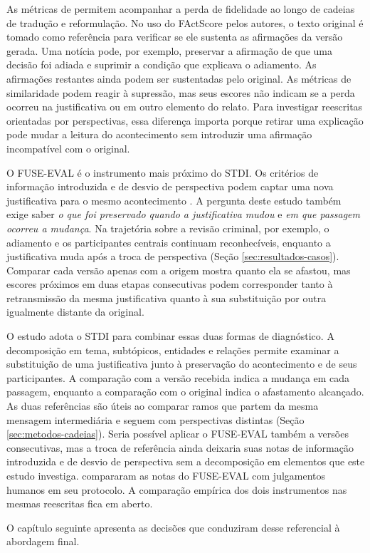 As métricas de  permitem acompanhar a perda de fidelidade ao longo de cadeias de tradução e reformulação. No uso do FActScore pelos autores, o texto original é tomado como referência para verificar se ele sustenta as afirmações da versão gerada. Uma notícia pode, por exemplo, preservar a afirmação de que uma decisão foi adiada e suprimir a condição que explicava o adiamento. As afirmações restantes ainda podem ser sustentadas pelo original. As métricas de similaridade podem reagir à supressão, mas seus escores não indicam se a perda ocorreu na justificativa ou em outro elemento do relato. Para investigar reescritas orientadas por perspectivas, essa diferença importa porque retirar uma explicação pode mudar a leitura do acontecimento sem introduzir uma afirmação incompatível com o original.

O FUSE-EVAL é o instrumento mais próximo do STDI. Os critérios de informação introduzida e de desvio de perspectiva podem captar uma nova justificativa para o mesmo acontecimento \cite{liu2025stepwise}. A pergunta deste estudo também exige saber \emph{o que foi preservado quando a justificativa mudou} e \emph{em que passagem ocorreu a mudança}. Na trajetória sobre a revisão criminal, por exemplo, o adiamento e os participantes centrais continuam reconhecíveis, enquanto a justificativa muda após a troca de perspectiva (Seção \ref{sec:resultados-casos}). Comparar cada versão apenas com a origem mostra quanto ela se afastou, mas escores próximos em duas etapas consecutivas podem corresponder tanto à retransmissão da mesma justificativa quanto à sua substituição por outra igualmente distante da original.

O estudo adota o STDI para combinar essas duas formas de diagnóstico. A decomposição em tema, subtópicos, entidades e relações permite examinar a substituição de uma justificativa junto à preservação do acontecimento e de seus participantes. A comparação com a versão recebida indica a mudança em cada passagem, enquanto a comparação com o original indica o afastamento alcançado. As duas referências são úteis ao comparar ramos que partem da mesma mensagem intermediária e seguem com perspectivas distintas (Seção \ref{sec:metodos-cadeias}). Seria possível aplicar o FUSE-EVAL também a versões consecutivas, mas a troca de referência ainda deixaria suas notas de informação introduzida e de desvio de perspectiva sem a decomposição em elementos que este estudo investiga.  compararam as notas do FUSE-EVAL com julgamentos humanos em seu protocolo. A comparação empírica dos dois instrumentos nas mesmas reescritas fica em aberto.

O capítulo seguinte apresenta as decisões que conduziram desse referencial à abordagem final.
